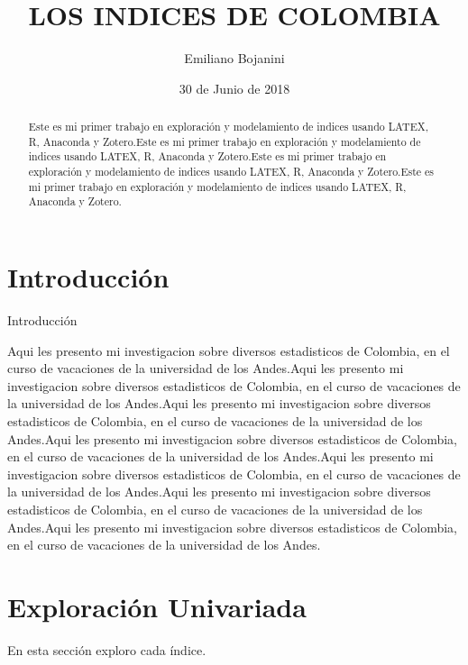 \documentclass{article}
\title{LOS INDICES DE COLOMBIA}
\author[1]{\normalsize Emiliano Bojanini}
\affil[1,2]{\small  Escuela de Ingeniería,Universidad de los Andes\\
\texttt{{delcurso,deallado}@uniandes.edu.col}}
\affil[1]{\small Instituto de altas investigaciones financieras\\
Banco del Parque\\
\texttt{delcurso@bp.com.col}}
\date{30 de Junio de 2018}
\begin{document}



\maketitle


\begin{abstract}

Este es mi primer trabajo en exploración y modelamiento de indices usando LATEX, R, Anaconda y Zotero.Este es mi primer trabajo en exploración y modelamiento de indices usando LATEX, R, Anaconda y Zotero.Este es mi primer trabajo en exploración y modelamiento de indices usando LATEX, R, Anaconda y Zotero.Este es mi primer trabajo en exploración y modelamiento de indices usando LATEX, R, Anaconda y Zotero. 
\end{abstract}

\section*{Introducción}

Introducción

Aqui les presento mi investigacion sobre diversos estadisticos de Colombia, en el curso de vacaciones de la universidad de los Andes.Aqui les presento mi investigacion sobre diversos estadisticos de Colombia, en el curso de vacaciones de la universidad de los Andes.Aqui les presento mi investigacion sobre diversos estadisticos de Colombia, en el curso de vacaciones de la universidad de los Andes.Aqui les presento mi investigacion sobre diversos estadisticos de Colombia, en el curso de vacaciones de la universidad de los Andes.Aqui les presento mi investigacion sobre diversos estadisticos de Colombia, en el curso de vacaciones de la universidad de los Andes.Aqui les presento mi investigacion sobre diversos estadisticos de Colombia, en el curso de vacaciones de la universidad de los Andes.Aqui les presento mi investigacion sobre diversos estadisticos de Colombia, en el curso de vacaciones de la universidad de los Andes.


\clearpage



\section{Exploración Univariada}\label{univariada}

En esta sección exploro cada índice. 
\end{document}
